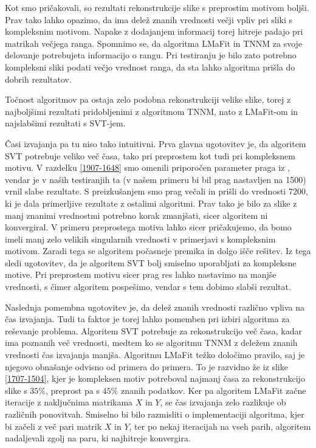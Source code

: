 Kot smo pričakovali, so rezultati rekonstrukcije slike s preprostim motivom boljši. Prav tako lahko opazimo, da ima delež znanih vrednosti večji vpliv pri sliki s kompleksnim motivom. Napake z dodajanjem informacij torej hitreje padajo pri matrikah večjega ranga. Spomnimo se, da algoritma LMaFit in TNNM za svoje delovanje potrebujeta informacijo o rangu. Pri testiranju je bilo zato potrebno kompleksni sliki podati večjo vrednost ranga, da sta lahko algoritma prišla do dobrih rezultatov.

Točnost algoritmov pa ostaja zelo podobna rekonstrukciji velike slike, torej z najboljšimi rezultati pridobljenimi z algoritmom TNNM, nato z LMaFit-om in najslabšimi rezultati s SVT-jem.





Časi izvajanja pa tu niso tako intuitivni. Prva glavna ugotovitev je, da algoritem SVT potrebuje veliko več časa, tako pri preprostem kot tudi pri kompleksnem motivu. V razdelku \ref{1907-1648} smo omenili priporočen parameter praga iz \cite{CCS}, vendar je v naših testiranjih ta (v našem primeru bi bil prag nastavljen na 1500) vrnil slabe rezultate. S preizkušanjem smo prag večali in prišli do vrednosti 7200, ki je dala primerljive rezultate z ostalimi algoritmi. Prav tako je bilo za slike z manj znanimi vrednostmi potrebno korak zmanjšati, sicer algoritem ni konvergiral. V primeru preprostega motiva lahko sicer pričakujemo, da bomo imeli manj zelo velikih singularnih vrednosti v primerjavi s kompleksnim motivom.  Zaradi tega se algoritem počasneje premika in dolgo išče rešitev. Iz tega sledi ugotovitev, da je algoritem SVT bolj smiselno uporabljati za kompleksne motive. Pri preprostem motivu sicer prag res lahko nastavimo na manjše vrednosti, s čimer algoritem pospešimo, vendar s tem dobimo slabši rezultat.

Naslednja pomembna ugotovitev je, da delež znanih vrednosti različno vpliva na čas izvajanja. Tudi ta faktor je torej lahko pomemben pri izbiri algoritma za reševanje problema. Algoritem SVT potrebuje za rekonstrukcijo več časa, kadar ima poznanih več vrednosti, medtem ko se algoritmu TNNM z deležem znanih vrednosti čas izvajanja manjša. Algoritmu LMaFit težko določimo pravilo, saj je njegovo obnašanje odvisno od primera do primera. To je razvidno že iz slike \ref{1707-1504}, kjer je kompleksen motiv potreboval najmanj časa za rekonstrukcijo slike s $35\%$, preprost pa s $45\%$ znanih podatkov. Ker pa algoritem LMaFit začne iteracije z naključnima matrikama $X$ in $Y$, se čas izvajanja zelo razlikuje ob različnih ponovitvah. Smiselno bi bilo razmisliti o implementaciji algoritma, kjer bi začeli z več pari matrik $X$ in $Y$, ter po nekaj iteracijah na vseh parih, algoritem nadaljevali zgolj na paru, ki najhitreje konvergira.

